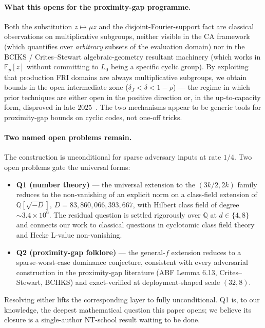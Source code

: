 \documentclass[11pt]{article}
\theoremstyle{definition}
\theoremstyle{remark}
\begin{document}
\paragraph{What this opens for the proximity-gap programme.}
Both the substitution $z \mapsto \mu z$ and the disjoint-Fourier-support
fact are classical observations on multiplicative subgroups, neither
visible in the CA framework (which quantifies over \emph{arbitrary}
subsets of the evaluation domain) nor in the BCIKS / Crites--Stewart
algebraic-geometry resultant machinery (which works in $\mathbb{F}_p[z]$
without committing to $L_0$ being a specific cyclic group). By
exploiting that production FRI domains are always multiplicative
subgroups, we obtain bounds in the open intermediate zone
($\delta_J < \delta < 1 - \rho$) --- the regime in which prior
techniques are either open in the positive direction or, in the
up-to-capacity form, disproved in late
$2025$~\cite{CritesStewart2025,BCHKS,DiamondGruen}. The two mechanisms
appear to be generic tools for proximity-gap bounds on cyclic codes, not
one-off tricks.

\paragraph{Two named open problems remain.}
The construction is unconditional for sparse adversary inputs at
rate $1/4$. Two open problems gate the universal forms:
\begin{itemize}[nosep,leftmargin=*]
\item \textbf{Q1 (number theory)} --- the universal extension to
the $(3k/2, 2k)$ family reduces to the non-vanishing of an explicit
norm on a class-field extension of $\mathbb{Q}[\sqrt{-D}]$,
$D = 83{,}860{,}066{,}393{,}667$, with Hilbert class field of degree
${\sim}3.4 \times 10^6$. The residual question is settled rigorously
over $\mathbb{Q}$ at $d \in \{4, 8\}$ and connects our work to
classical questions in cyclotomic class field theory and Hecke
L-value non-vanishing.
\item \textbf{Q2 (proximity-gap folklore)} --- the general-$f$
extension reduces to a sparse-worst-case dominance conjecture,
consistent with every adversarial construction in the proximity-gap
literature (ABF Lemma 6.13, Crites--Stewart, BCHKS) and exact-verified
at deployment-shaped scale $(32, 8)$.
\end{itemize}
Resolving either lifts the corresponding layer to fully
unconditional. Q1 is, to our knowledge, the deepest mathematical
question this paper opens; we believe its closure is a single-author
NT-school result waiting to be done.
\end{document}
